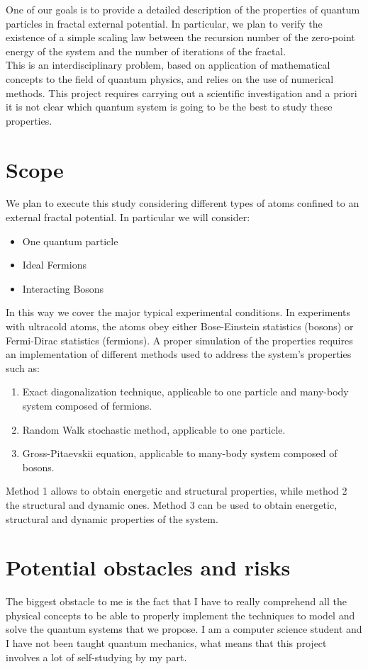 \documentclass{article}
\begin{document}
One of our goals is to provide a detailed description of the properties of quantum particles in fractal external potential. In particular, we plan to verify the existence of a simple scaling law between the recursion number of the zero-point energy of the system and the number of iterations of the fractal.\\

This is an interdisciplinary problem, based on application of mathematical concepts to the field of quantum physics, and relies on the use of numerical methods. This project requires carrying out a scientific investigation and a priori it is not clear which quantum system is going to be the best to study these properties.

\section{Scope}
We plan to execute this study considering different types of atoms confined to an external fractal potential. In particular we will consider:
\begin{itemize}
    \item One quantum particle 
    \item Ideal Fermions
    \item Interacting Bosons
\end{itemize}

In this way we cover the major typical experimental conditions. In experiments with ultracold atoms, the atoms obey either Bose-Einstein statistics (bosons) or Fermi-Dirac statistics (fermions). A proper simulation of the properties requires an implementation of different methods used to address the system's properties such as:
\begin{enumerate}
    \item Exact diagonalization technique, applicable to one particle and many-body system composed of fermions.
    \item Random Walk stochastic method, applicable to one particle.
    \item Gross-Pitaevskii equation, applicable to many-body system composed of bosons.
\end{enumerate}
Method 1 allows to obtain energetic and structural properties, while method 2 the structural and dynamic ones. Method 3 can be used to obtain energetic, structural and dynamic properties of the system.


\section{Potential obstacles and risks}
The biggest obstacle to me is the fact that I have to really comprehend all the physical concepts to be able to properly implement the techniques to model and solve the quantum systems that we propose. I am a computer science student and I have not been taught quantum mechanics, what means that this project involves a lot of self-studying by my part.\\
\end{document}
